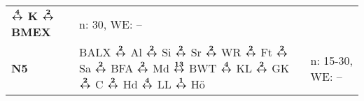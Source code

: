\begin{minipage}[t]{0.45\textwidth}
\begin{tabular}{>{\bfseries}L{1.2cm}L{9.0cm}L{3.0cm}}
                $\xarwe{4}$ K $\xarwe{2}$ BMEX                                                                                                                                      & n: 30, WE: --              \\
\nbus{} N5    & BALX $\xarwe{2}$ Al $\xarwe{2}$ Si $\xarwe{2}$ Sr $\xarwe{2}$ WR $\xarwe{2}$ Ft $\xarwe{2}$ Sa $\xarwe{2}$ BFA $\xarwe{2}$ Md $\xarwe{13}$ BWT $\xarwe{4}$ KL     %
                $\xarwe{2}$ GK $\xarwe{2}$ C $\xarwe{2}$ Hd $\xarwe{4}$ LL $\xarwe{1}$ Hö                                                                                           & n: 15-30, WE: --           \\
\hline
\end{tabular}
\end{minipage}
\begin{minipage}[t]{0.05\textwidth}
\phantom{Tor}
\end{minipage}


